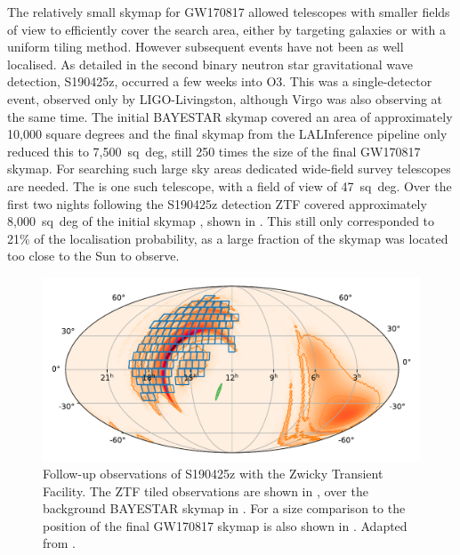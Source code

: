 \begin{colsection}
\begin{colsection}
The relatively small skymap for GW170817 allowed telescopes with smaller fields of view to efficiently cover the search area, either by targeting galaxies or with a uniform tiling method. However subsequent events have not been as well localised. As detailed in  the second binary neutron star gravitational wave detection, S190425z, occurred a few weeks into O3. This was a single-detector event, observed only by LIGO-Livingston, although Virgo was also observing at the same time. The initial BAYESTAR skymap covered an area of approximately 10,000 square degrees and the final skymap from the LALInference pipeline only reduced this to 7,500~sq~deg, still 250 times the size of the final GW170817 skymap. For searching such large sky areas dedicated wide-field survey telescopes are needed. The  is one such telescope, with a field of view of 47~sq~deg. Over the first two nights following the S190425z detection ZTF covered approximately 8,000~sq~deg of the initial skymap \citep{GW190425_ZTF}, shown in . This still only corresponded to 21\% of the localisation probability, as a large fraction of the skymap was located too close to the Sun to observe.

\begin{figure}[t]
    \begin{center}
        \includegraphics[width=\linewidth]{images/190425.pdf}
    \end{center}
    \caption[Follow-up observations of S190425z with ZTF]{
        Follow-up observations of S190425z with the Zwicky Transient Facility. The ZTF tiled observations are shown in , over the background BAYESTAR skymap in . For a size comparison to  the position of the final GW170817 skymap is also shown in . Adapted from \citet{GW190425_ZTF}.
        }\label{fig:ztf}
\end{figure}


\end{colsection}
\end{colsection}
